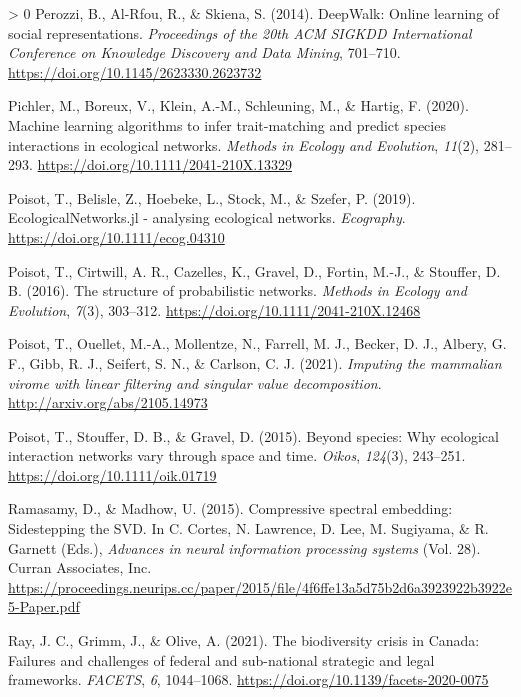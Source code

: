 \documentclass[11pt]{article}
\newlength{\cslhangindent}
\newenvironment{CSLReferences}[3] %
 {%
  \setlength{\parindent}{0pt}
  \ifodd #1 \everypar{\setlength{\hangindent}{\cslhangindent}}\ignorespaces\fi
  \ifnum #2 > 0
  \setlength{\parskip}{#2\baselineskip}
  \fi
 }%
 {}
\begin{document}
\begin{CSLReferences}{1}{0}
\leavevmode\hypertarget{ref-Perozzi2014DeeOnl}{}%
Perozzi, B., Al-Rfou, R., \& Skiena, S. (2014). DeepWalk: Online
learning of social representations. \emph{Proceedings of the 20th ACM
SIGKDD International Conference on Knowledge Discovery and Data Mining},
701--710. \url{https://doi.org/10.1145/2623330.2623732}

\leavevmode\hypertarget{ref-Pichler2020MacLea}{}%
Pichler, M., Boreux, V., Klein, A.-M., Schleuning, M., \& Hartig, F.
(2020). Machine learning algorithms to infer trait-matching and predict
species interactions in ecological networks. \emph{Methods in Ecology
and Evolution}, \emph{11}(2), 281--293.
\url{https://doi.org/10.1111/2041-210X.13329}

\leavevmode\hypertarget{ref-Poisot2019EcoJl}{}%
Poisot, T., Belisle, Z., Hoebeke, L., Stock, M., \& Szefer, P. (2019).
EcologicalNetworks.jl - analysing ecological networks. \emph{Ecography}.
\url{https://doi.org/10.1111/ecog.04310}

\leavevmode\hypertarget{ref-Poisot2016StrPro}{}%
Poisot, T., Cirtwill, A. R., Cazelles, K., Gravel, D., Fortin, M.-J., \&
Stouffer, D. B. (2016). The structure of probabilistic networks.
\emph{Methods in Ecology and Evolution}, \emph{7}(3), 303--312.
\url{https://doi.org/10.1111/2041-210X.12468}

\leavevmode\hypertarget{ref-Poisot2021ImpMam}{}%
Poisot, T., Ouellet, M.-A., Mollentze, N., Farrell, M. J., Becker, D.
J., Albery, G. F., Gibb, R. J., Seifert, S. N., \& Carlson, C. J.
(2021). \emph{Imputing the mammalian virome with linear filtering and
singular value decomposition}. \url{http://arxiv.org/abs/2105.14973}

\leavevmode\hypertarget{ref-Poisot2015SpeWhy}{}%
Poisot, T., Stouffer, D. B., \& Gravel, D. (2015). Beyond species: Why
ecological interaction networks vary through space and time.
\emph{Oikos}, \emph{124}(3), 243--251.
\url{https://doi.org/10.1111/oik.01719}

\leavevmode\hypertarget{ref-Ramasamy2015ComSpe}{}%
Ramasamy, D., \& Madhow, U. (2015). Compressive spectral embedding:
Sidestepping the SVD. In C. Cortes, N. Lawrence, D. Lee, M. Sugiyama, \&
R. Garnett (Eds.), \emph{Advances in neural information processing
systems} (Vol. 28). Curran Associates, Inc.
\url{https://proceedings.neurips.cc/paper/2015/file/4f6ffe13a5d75b2d6a3923922b3922e5-Paper.pdf}

\leavevmode\hypertarget{ref-Ray2021BioCri}{}%
Ray, J. C., Grimm, J., \& Olive, A. (2021). The biodiversity crisis in
Canada: Failures and challenges of federal and sub-national strategic
and legal frameworks. \emph{FACETS}, \emph{6}, 1044--1068.
\url{https://doi.org/10.1139/facets-2020-0075}


\end{CSLReferences}
\end{document}
